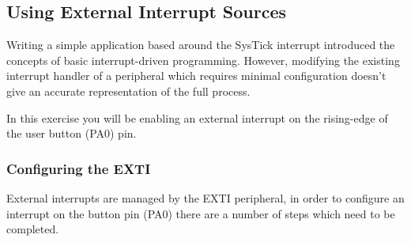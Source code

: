\documentclass[11pt,fleqn]{book} %
\begin{document}
\subsection{Using External Interrupt Sources}
Writing a simple application based around the SysTick interrupt introduced the concepts of basic interrupt-driven programming. However, modifying the existing interrupt handler of a peripheral which requires minimal configuration doesn't give an accurate representation of the full process.  

In this exercise you will be enabling an external interrupt on the rising-edge of the user button (PA0) pin. 

\subsubsection{Configuring the EXTI}
External interrupts are managed by the EXTI peripheral, in order to configure an interrupt on the button pin (PA0) there are a number of steps which need to be completed. 
\end{document}
